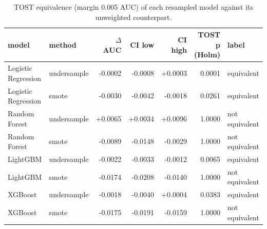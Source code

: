 \begin{table}[t]
\centering
\caption{TOST equivalence (margin 0.005 AUC) of each resampled model against its unweighted counterpart.}
\label{tab:T11b_resampling_tests}
\small
\begin{tabular}{llrrrrl}
\toprule
model & method & $\Delta$ AUC & CI low & CI high & TOST p (Holm) & label \\
\midrule
Logistic Regression & undersample & -0.0002 & -0.0008 & +0.0003 & 0.0001 & equivalent \\
Logistic Regression & smote & -0.0030 & -0.0042 & -0.0018 & 0.0261 & equivalent \\
Random Forest & undersample & +0.0065 & +0.0034 & +0.0096 & 1.0000 & not equivalent \\
Random Forest & smote & -0.0089 & -0.0148 & -0.0029 & 1.0000 & not equivalent \\
LightGBM & undersample & -0.0022 & -0.0033 & -0.0012 & 0.0065 & equivalent \\
LightGBM & smote & -0.0174 & -0.0208 & -0.0140 & 1.0000 & not equivalent \\
XGBoost & undersample & -0.0018 & -0.0040 & +0.0004 & 0.0383 & equivalent \\
XGBoost & smote & -0.0175 & -0.0191 & -0.0159 & 1.0000 & not equivalent \\
\bottomrule
\end{tabular}
\end{table}
